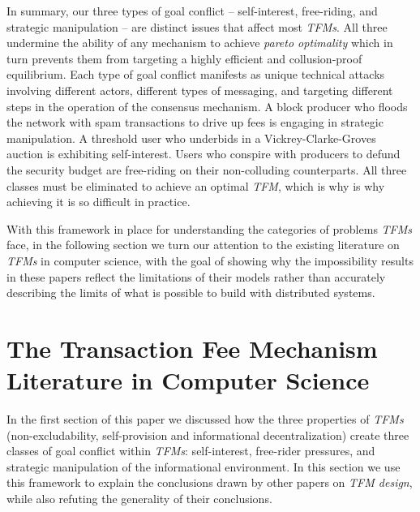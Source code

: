 \documentclass[sigconf,anonymous]{aamas}
\begin{document}
In summary, our three types of goal conflict -- self-interest, free-riding, and strategic manipulation -- are distinct issues that affect most \textit{TFMs}. All three undermine the ability of any mechanism to achieve \textit{pareto optimality} which in turn prevents them from targeting a highly efficient and collusion-proof equilibrium. Each type of goal conflict manifests as unique technical attacks involving different actors, different types of messaging, and targeting different steps in the operation of the consensus mechanism. A block producer who floods the network with spam transactions to drive up fees is engaging in strategic manipulation. A threshold user who underbids in a Vickrey-Clarke-Groves auction is exhibiting self-interest. Users who conspire with producers to defund the security budget are free-riding on their non-colluding counterparts. All three classes must be eliminated to achieve an optimal \textit{TFM}, which is why is why achieving it is so difficult in practice.

With this framework in place for understanding the categories of problems \textit{TFMs} face, in the following section we turn our attention to the existing literature on \textit{TFMs} in computer science, with the goal of showing why the impossibility results in these papers reflect the limitations of their models rather than accurately describing the limits of what is possible to build with distributed systems.


\section{The Transaction Fee Mechanism Literature in Computer Science\label{sec::section1p2}}

In the first section of this paper we discussed how the three properties of \textit{TFMs} (non-excludability, self-provision and informational decentralization) create three classes of goal conflict within \textit{TFMs}: self-interest, free-rider pressures, and strategic manipulation of the informational environment. In this section we use this framework to explain the conclusions drawn by other papers on \textit{TFM design}, while also refuting the generality of their conclusions.
\end{document}

